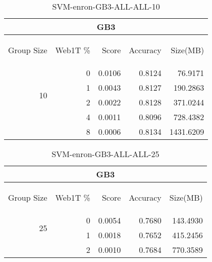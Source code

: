 \begin{center}
\begin{table}[htbp] 
 \begin{center}
\begin{tabular}{ | r | r | r | r | r |}
\hline
\multicolumn{5}{|c|}{GB3}\\
\hline
\begin{sideways}Group Size\end{sideways} & \begin{sideways}Web1T \%\end{sideways} & \begin{sideways}Score\end{sideways} & \begin{sideways}Accuracy\end{sideways} & \begin{sideways}Size(MB)\end{sideways}\\
\hline
\multirow{4}{*}{10}
 & 0 & 0.0106 & 0.8124 & 76.9171\\ \cline{2-5}
 & 1 & 0.0043 & 0.8127 & 190.2863\\ \cline{2-5}
 & 2 & 0.0022 & 0.8128 & 371.0244\\ \cline{2-5}
 & 4 & 0.0011 & 0.8096 & 728.4382\\ \cline{2-5}
 & 8 & 0.0006 & 0.8134 & 1431.6209\\ \cline{2-5}
\hline
\end{tabular}
\caption{SVM-enron-GB3-ALL-ALL-10}
\label{table:SVM-enron-GB3-ALL-ALL-10}
\end{center}
 \end{table}
\end{center}

\begin{center}
\begin{table}[htbp] 
 \begin{center}
\begin{tabular}{ | r | r | r | r | r |}
\hline
\multicolumn{5}{|c|}{GB3}\\
\hline
\begin{sideways}Group Size\end{sideways} & \begin{sideways}Web1T \%\end{sideways} & \begin{sideways}Score\end{sideways} & \begin{sideways}Accuracy\end{sideways} & \begin{sideways}Size(MB)\end{sideways}\\
\hline
\multirow{2}{*}{25}
 & 0 & 0.0054 & 0.7680 & 143.4930\\ \cline{2-5}
 & 1 & 0.0018 & 0.7652 & 415.2456\\ \cline{2-5}
 & 2 & 0.0010 & 0.7684 & 770.3589\\ \cline{2-5}
\hline
\end{tabular}
\caption{SVM-enron-GB3-ALL-ALL-25}
\label{table:SVM-enron-GB3-ALL-ALL-25}
\end{center}
 \end{table}
\end{center}

